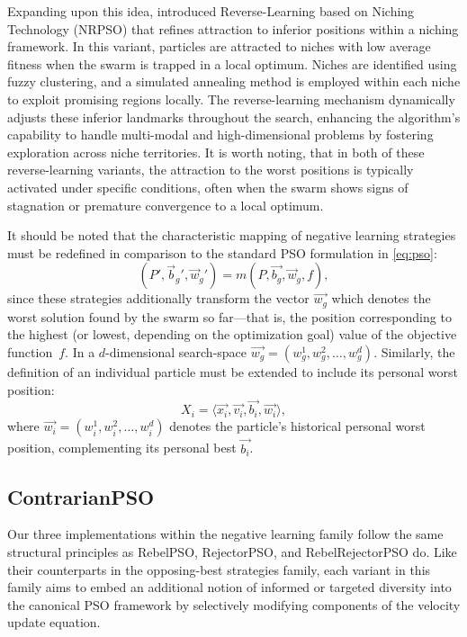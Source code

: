 {Expanding upon this idea, \citet{dong2018reverselearning} introduced Reverse-Learning based on Niching Technology (NRPSO) that refines attraction to inferior positions within a niching framework. In this variant, particles are attracted to niches with low average fitness when the swarm is trapped in a local optimum. Niches are identified using fuzzy clustering, and a simulated annealing method is employed within each niche to exploit promising regions locally. The reverse-learning mechanism dynamically adjusts these inferior landmarks throughout the search, enhancing the algorithm’s capability to handle multi-modal and high-dimensional problems by fostering exploration across niche territories. It is worth noting, that in both of these reverse-learning variants, the attraction to the worst positions is typically activated under specific conditions, often when the swarm shows signs of stagnation or premature convergence to a local optimum. 

\enlargethispage{.1\baselineskip}
It should be noted that the characteristic mapping of negative learning strategies must be redefined in comparison to the standard PSO formulation in \eqref{eq:pso}:
\begin{equation}\label{eq:negative_pso}
(P', \vec{b}_g', \vec{w}_g') = m(P, \vec{b_g}, \vec{w}_g, f),
\end{equation}
since these strategies additionally transform the vector \(\vec{w_g}\) which denotes the worst solution found by the swarm so far—that is, the position corresponding to the highest (or lowest, depending on the optimization goal) value of the objective function~\(f\).
In a \(d\)-dimensional \gls{search-space} \(\vec{w_g} = (w_{g}^{1}, w_{g}^{2}, \dots, w_{g}^{d}) \). Similarly, the definition of an individual particle must be extended to include its personal worst position:
\begin{equation}\label{eq:particle_negative}
X_i = \langle \vec{x_i}, \vec{v_{i}}, \vec{b_i}, \vec{w_i} \rangle,
\end{equation}
where  
\(\vec{w_i} = (w_{i}^{1}, w_{i}^{2}, \dots, w_{i}^{d}) \) denotes the particle’s historical personal worst position, complementing its personal best $\vec{b_i}$.



\subsection*{ContrarianPSO}

Our three implementations within the negative learning family follow the same structural principles as RebelPSO, RejectorPSO, and RebelRejectorPSO do. Like their counterparts in the opposing-best strategies family, each variant in this family aims to embed an additional notion of informed or targeted diversity into the canonical PSO framework by selectively modifying components of the velocity update equation.

}
